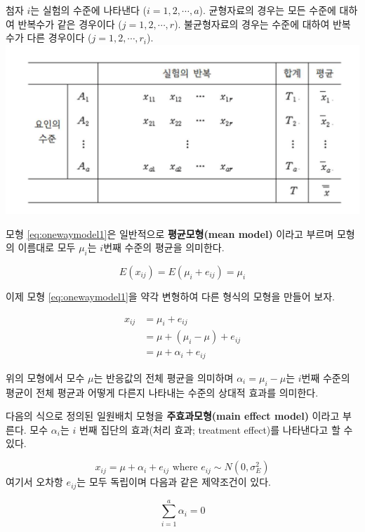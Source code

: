 \documentclass[
]{book}
\begin{document}
첨자 \(i\)는 실험의 수준에 나타낸다 (\(i=1, 2, \cdots, a\)). 균형자료의 경우는 모든 수준에 대하여 반복수가 같은 경우이다 (\(j=1,2,\cdots,r\)). 불균형자료의 경우는 수준에 대하여 반복수가 다른 경우이다 (\(j=1,2,\cdots,r_i\)).
\includegraphics{oneway-data.png}

모형 \eqref{eq:onewaymodel1}은 일반적으로 \textbf{평균모형(mean model)} 이라고 부르며 모형의 이름대로 모두 \(\mu_i\)는 \(i\)번째 수준의 평균을 의미한다.

\[ E(x_{ij}) = E(\mu_i + e_{ij}) = \mu_i \]

이제 모형 \eqref{eq:onewaymodel1}을 약각 변형하여 다른 형식의 모형을 만들어 보자.

\begin{align*} 
x_{ij} & = \mu_i + e_{ij} \\
      & = \mu + (\mu_i - \mu) + e_{ij} \\
      & = \mu + \alpha_i + e_{ij}
\end{align*}

위의 모형에서 모수 \(\mu\)는 반응값의 전체 평균을 의미하며 \(\alpha_i = \mu_i - \mu\)는 \(i\)번째 수준의 평균이 전체 평균과 어떻게 다른지 나타내는 수준의 상대적 효과를 의미한다.

다음의 식으로 정의된 일원배치 모형을 \textbf{주효과모형(main effect model)} 이라고 부른다.
모수 \(\alpha_i\)는 \(i\) 번째 집단의 효과(처리 효과; treatment effect)를 나타낸다고 할 수 있다.

\begin{equation}
x_{ij} = \mu + \alpha_i + e_{ij} \text{ where } e_{ij} \sim N(0,\sigma_E^2)
\label{eq:onewaymodel2}
\end{equation}
여기서 오차항 \(e_{ij}\)는 모두 독립이며 다음과 같은 제약조건이 있다.

\begin{equation}
\sum_{i=1}^a \alpha_i = 0
\label{eq:onewaycondition}
\end{equation}
\end{document}
